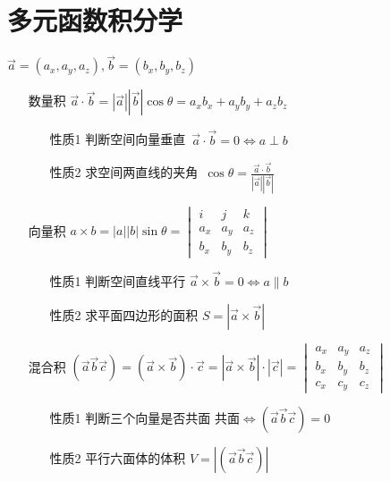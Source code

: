 \documentclass[12pt, a4paper, oneside, UTF8]{ctexbook}
\begin{document}
\else
\fi

\chapter{多元函数积分学}

\begin{tcolorbox}[title=三维向量]
$\vec{a}=(a_x,a_y,a_z), \vec{b}=(b_x,b_y,b_z)$ 
\begin{enumerate}
    \item [数量积] $\vec{a}\cdot\vec{b} = \left|\vec{a}\right|\left|\vec{b}\right|\cos{\theta}=
    a_xb_x+a_yb_y+a_zb_z$ 
    \begin{enumerate}
        \item [性质1] 判断空间向量垂直\ $\vec{a}\cdot\vec{b}=0\iff a\perp b$ 
        \item [性质2] 求空间两直线的夹角\ $\displaystyle \cos\theta = \frac{\vec{a}\cdot\vec{b}}{\left|\vec{a}\right|\left|\vec{b}\right|}$
    \end{enumerate}
    \item [向量积] $a\times b = |a||b|\sin\theta = \begin{vmatrix}
        i & j & k\\
        a_x & a_y & a_z \\
        b_x & b_y & b_z
    \end{vmatrix}$
    \begin{enumerate}
        \item [性质1] 判断空间直线平行 $\vec{a}\times\vec{b}=0\iff a\parallel b$
        \item [性质2] 求平面四边形的面积 $S=\left|\vec{a}\times\vec{b}\right|$ 
    \end{enumerate}
    \item [混合积] $(\vec{a}\vec{b}\vec{c})=(\vec{a}\times\vec{b})\cdot\vec{c} = \left|\vec{a}\times\vec{b}\right|\cdot\left|\vec{c}\right|
    =\begin{vmatrix}
        a_x & a_y & a_z \\
        b_x & b_y & b_z \\
        c_x & c_y & c_z
    \end{vmatrix}$ 
    \begin{enumerate}
        \item [性质1] 判断三个向量是否共面 $\text{共面}\iff (\vec{a}\vec{b}\vec{c})=0$
        \item [性质2] 平行六面体的体积 $V=\left|(\vec{a}\vec{b}\vec{c})\right|$
    \end{enumerate}
\end{enumerate}

\end{tcolorbox}
\end{document}
